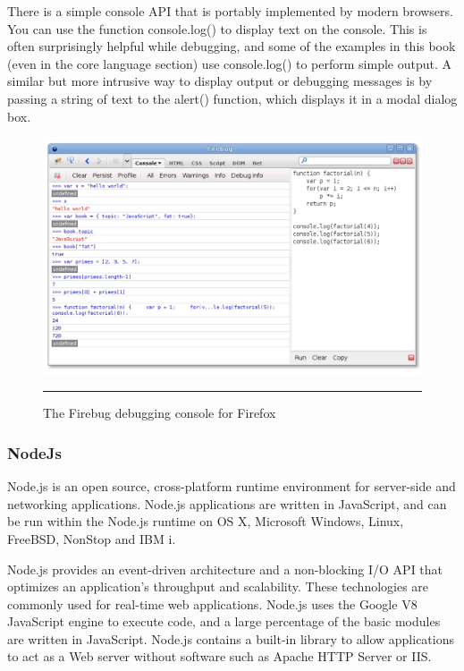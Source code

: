 There is a simple console API that is portably implemented by modern browsers. You
can use the function console.log() to display text on the console. This is often surprisingly
helpful while debugging, and some of the examples in this book (even in the
core language section) use console.log() to perform simple output. A similar but more
intrusive way to display output or debugging messages is by passing a string of text to
the alert() function, which displays it in a modal dialog box.\cite{20}
\begin{figure}[h!]
  \centering
    \includegraphics[width=\textwidth]{./Pictures/firebug.jpg}
  \rule{1\textwidth}{1pt}
 \caption{The Firebug debugging console for Firefox}
 \label{fig:Firebug}
\end{figure}

\subsubsection{NodeJs}
Node.js is an open source, cross-platform runtime environment for server-side and networking applications. Node.js applications are written in JavaScript, and can be run within the Node.js runtime on OS X, Microsoft Windows, Linux, FreeBSD, NonStop and IBM i.

Node.js provides an event-driven architecture and a non-blocking I/O API that optimizes an application's throughput and scalability. These technologies are commonly used for real-time web applications.
Node.js uses the Google V8 JavaScript engine to execute code, and a large percentage of the basic modules are written in JavaScript. Node.js contains a built-in library to allow applications to act as a Web server without software such as Apache HTTP Server or IIS.\cite{17}
\clearpage



